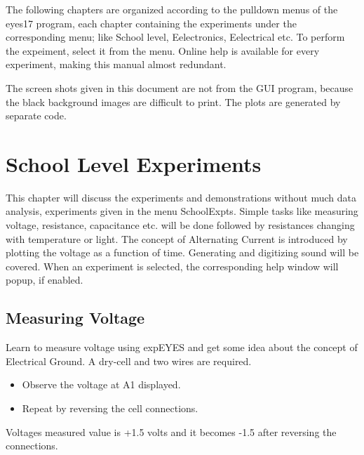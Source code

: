 \documentclass[a4paper,12pt,english]{sphinxmanual}
\let\sphinxpxdimen\pdfpxdimen\else\newdimen\sphinxpxdimen
\begin{document}
The following chapters are organized according to the pulldown menus of
the eyes17 program, each chapter containing the experiments under the
corresponding menu; like School level, Eelectronics, Eelectrical etc. To
perform the expeiment, select it from the menu. Online help is available
for every experiment, making this manual almost redundant.

The screen shots given in this document are not from the GUI program,
because the black background images are difficult to print. The plots
are generated by separate code.


\chapter{School Level Experiments}
\label{\detokenize{index:school-level-experiments}}
This chapter will discuss the experiments and demonstrations without
much data analysis, experiments given in the menu SchoolExpts. Simple
tasks like measuring voltage, resistance, capacitance etc. will be done
followed by resistances changing with temperature or light. The concept
of Alternating Current is introduced by plotting the voltage as a
function of time. Generating and digitizing sound will be covered. When
an experiment is selected, the corresponding help window will popup, if
enabled.


\section{Measuring Voltage}
\label{\detokenize{2.1:measuring-voltage}}\label{\detokenize{2.1::doc}}

Learn to measure voltage using expEYES and get some idea about the
concept of Electrical Ground. A dry-cell and two wires are required.

\noindent\sphinxincludegraphics[width=300\sphinxpxdimen]{{measure-dc}.pdf}

\begin{itemize}
\item {} 
Observe the voltage at A1 displayed.

\item {} 
Repeat by reversing the cell connections.

\end{itemize}


Voltages measured value is +1.5 volts and it becomes -1.5 after
reversing the connections.
\end{document}
